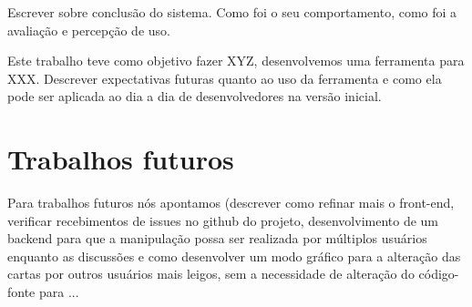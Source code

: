 \label{consideracoes}

Escrever sobre conclusão do sistema. Como foi o seu comportamento, como foi a avaliação e percepção de uso.

Este trabalho teve como objetivo fazer XYZ, desenvolvemos uma ferramenta para XXX. Descrever expectativas futuras quanto ao uso da ferramenta e como ela pode ser aplicada ao dia a dia de desenvolvedores na versão inicial.

\section{Trabalhos futuros}
Para trabalhos futuros nós apontamos (descrever como refinar mais o front-end, verificar recebimentos de issues no github do projeto, desenvolvimento de um backend para que a manipulação possa ser realizada por múltiplos usuários enquanto as discussões e como desenvolver um modo gráfico para a alteração das cartas por outros usuários mais leigos, sem a necessidade de alteração do código-fonte para ...